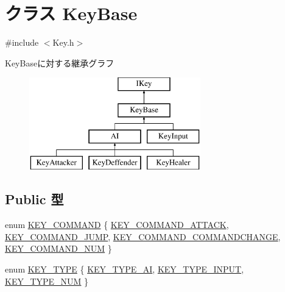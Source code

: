 \hypertarget{class_key_base}{\section{クラス Key\-Base}
\label{class_key_base}
}


{\ttfamily \#include $<$Key.\-h$>$}

Key\-Baseに対する継承グラフ\begin{figure}[H]
\begin{center}
\leavevmode
\includegraphics[height=4.000000cm]{dd/d2e/class_key_base}
\end{center}
\end{figure}
\subsection*{Public 型}
\begin{DoxyCompactItemize}
\item 
enum \hyperlink{class_key_base_a6e2d2326afadb1405879b31e4463e45f}{K\-E\-Y\-\_\-\-C\-O\-M\-M\-A\-N\-D} \{ \hyperlink{class_key_base_a6e2d2326afadb1405879b31e4463e45fadda545a53e15cba9c4530ad2ee6f2d3d}{K\-E\-Y\-\_\-\-C\-O\-M\-M\-A\-N\-D\-\_\-\-A\-T\-T\-A\-C\-K}, 
\hyperlink{class_key_base_a6e2d2326afadb1405879b31e4463e45fa314b03fd1202b9a7c601ecd2305b3403}{K\-E\-Y\-\_\-\-C\-O\-M\-M\-A\-N\-D\-\_\-\-J\-U\-M\-P}, 
\hyperlink{class_key_base_a6e2d2326afadb1405879b31e4463e45fa1db21e7286a02df319da11ca37456c15}{K\-E\-Y\-\_\-\-C\-O\-M\-M\-A\-N\-D\-\_\-\-C\-O\-M\-M\-A\-N\-D\-C\-H\-A\-N\-G\-E}, 
\hyperlink{class_key_base_a6e2d2326afadb1405879b31e4463e45fa886ced2b7b9c443cbfbac07192978d6e}{K\-E\-Y\-\_\-\-C\-O\-M\-M\-A\-N\-D\-\_\-\-N\-U\-M}
 \}
\item 
enum \hyperlink{class_key_base_ab22168ade2e4ac686bb475648df75095}{K\-E\-Y\-\_\-\-T\-Y\-P\-E} \{ \hyperlink{class_key_base_ab22168ade2e4ac686bb475648df75095a4fec21ea95d75a41839c6957d96c0970}{K\-E\-Y\-\_\-\-T\-Y\-P\-E\-\_\-\-A\-I}, 
\hyperlink{class_key_base_ab22168ade2e4ac686bb475648df75095ad92d619929c06fa294c7a49e0df70a13}{K\-E\-Y\-\_\-\-T\-Y\-P\-E\-\_\-\-I\-N\-P\-U\-T}, 
\hyperlink{class_key_base_ab22168ade2e4ac686bb475648df75095ac0def1177b7023819da9b6417f6f33c0}{K\-E\-Y\-\_\-\-T\-Y\-P\-E\-\_\-\-N\-U\-M}
 \}
\end{DoxyCompactItemize}
